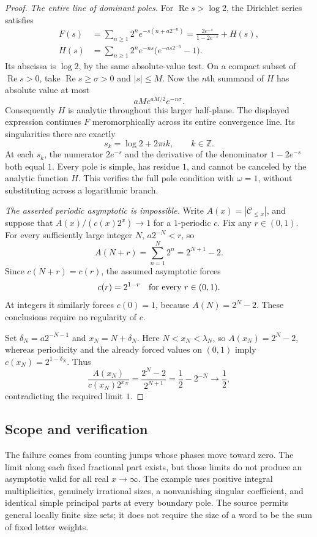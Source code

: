 \documentclass[10pt]{article}
\begin{document}
\begin{proof}
\emph{The entire line of dominant poles.}
For \(\operatorname{Re}s>\log2\), the Dirichlet series satisfies
\begin{align*}
 F(s)&=\sum_{n\ge1}2^n e^{-s(n+a2^{-n})}
      =\frac{2e^{-s}}{1-2e^{-s}}+H(s),\\
 H(s)&=\sum_{n\ge1}2^n e^{-ns}
                  \bigl(e^{-as2^{-n}}-1\bigr).
\end{align*}
Its abscissa is \(\log2\), by the same absolute-value test.
On a compact subset of \(\operatorname{Re}s>0\), take
\(\operatorname{Re}s\ge\sigma>0\) and \(|s|\le M\). Now the
\(n\)th summand of \(H\) has absolute value at most
\[
 aM e^{aM/2}e^{-n\sigma}.
\]
Consequently \(H\) is analytic throughout this larger half-plane.
The displayed expression continues \(F\) meromorphically across
its entire convergence line. Its singularities there are exactly
\[
 s_k=\log2+2\pi i k,\qquad k\in\mathbb Z.
\]
At each \(s_k\), the numerator \(2e^{-s}\) and the derivative of
the denominator \(1-2e^{-s}\) both equal \(1\). Every pole is
simple, has residue \(1\), and cannot be canceled by the analytic
function \(H\). This verifies the full pole condition with
\(\omega=1\), without substituting across a logarithmic branch.

\emph{The asserted periodic asymptotic is impossible.}
Write \(A(x)=|\mathcal C_{\le x}|\), and suppose that
\(A(x)/(c(x)2^x)\to1\) for a \(1\)-periodic \(c\).
Fix any \(r\in(0,1)\). For every sufficiently large integer \(N\),
\(a2^{-N}<r\), so
\[
 A(N+r)=\sum_{n=1}^N2^n=2^{N+1}-2.
\]
Since \(c(N+r)=c(r)\), the assumed asymptotic forces
\[
 c(r)=2^{1-r}\quad\hbox{for every }r\in(0,1).
\]
At integers it similarly forces \(c(0)=1\), because
\(A(N)=2^N-2\). These conclusions require no regularity of \(c\).

Set \(\delta_N=a2^{-N-1}\) and \(x_N=N+\delta_N\).
Here \(N<x_N<\lambda_N\), so \(A(x_N)=2^N-2\), whereas
periodicity and the already forced values on \((0,1)\) imply
\(c(x_N)=2^{1-\delta_N}\). Thus
\[
 \frac{A(x_N)}{c(x_N)2^{x_N}}
 =\frac{2^N-2}{2^{N+1}}
 =\frac12-2^{-N}\longrightarrow\frac12,
\]
contradicting the required limit \(1\).
\end{proof}

\subsection*{Scope and verification}
The failure comes from counting jumps whose phases move toward zero.
The limit along each fixed fractional part exists, but those limits
do not produce an asymptotic valid for all real \(x\to\infty\).
The example uses positive integral multiplicities, genuinely
irrational sizes, a nonvanishing singular coefficient, and identical
simple principal parts at every boundary pole. The source permits
general locally finite size sets; it does not require the size of a
word to be the sum of fixed letter weights.
\end{document}
